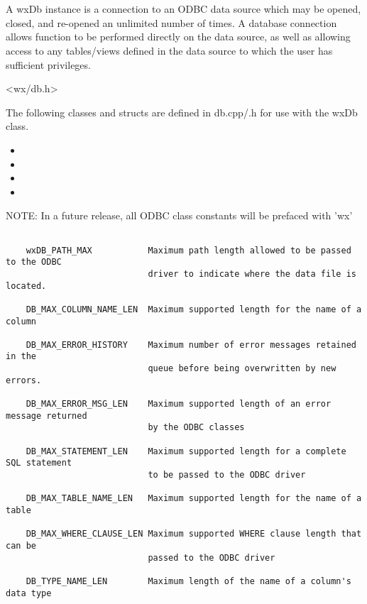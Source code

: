 \section{}\label{wxdb}

A wxDb instance is a connection to an ODBC data source which may
be opened, closed, and re-opened an unlimited number of times.  A
database connection allows function to be performed directly on the
data source, as well as allowing access to any tables/views defined in
the data source to which the user has sufficient privileges.


<wx/db.h>


The following classes and structs are defined in db.cpp/.h for use with the wxDb class.

\begin{itemize}\itemsep=0pt
\item {}
\item {}
\item {}
\item {}
\end{itemize}


NOTE: In a future release, all ODBC class constants will be prefaced with 'wx'

\begin{verbatim}

    wxDB_PATH_MAX           Maximum path length allowed to be passed to the ODBC
                            driver to indicate where the data file is located.

    DB_MAX_COLUMN_NAME_LEN  Maximum supported length for the name of a column

    DB_MAX_ERROR_HISTORY    Maximum number of error messages retained in the
                            queue before being overwritten by new errors.

    DB_MAX_ERROR_MSG_LEN    Maximum supported length of an error message returned 
                            by the ODBC classes

    DB_MAX_STATEMENT_LEN    Maximum supported length for a complete SQL statement
                            to be passed to the ODBC driver

    DB_MAX_TABLE_NAME_LEN   Maximum supported length for the name of a table

    DB_MAX_WHERE_CLAUSE_LEN Maximum supported WHERE clause length that can be 
                            passed to the ODBC driver

    DB_TYPE_NAME_LEN        Maximum length of the name of a column's data type
\end{verbatim}


